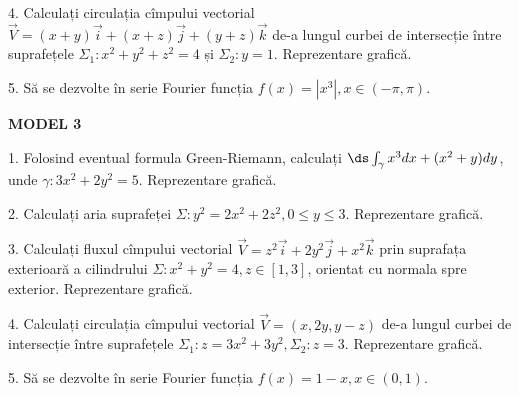 \vspace{0.3cm}

4. Calculați circulația cîmpului vectorial $ \vec{V} = (x + y) \vec{i} + (x + z) \vec{j} + (y + z) \vec{k} $
de-a lungul curbei de intersecție între suprafețele $ \Sigma_1: x^2 + y^2 + z^2 = 4 $ și
$ \Sigma_2: y = 1 $. Reprezentare grafică.

\vspace{0.3cm}

5. Să se dezvolte în serie Fourier funcția $ f(x) = |x^3|, x \in (-\pi, \pi) $.

\vspace{2cm}

\textbf{MODEL 3}

1. Folosind eventual formula Green-Riemann, calculați $ \ds\int_\gamma x^3 dx + (x^2 + y) dy $,
unde $ \gamma: 3x^2 + 2y^2 = 5 $. Reprezentare grafică.

\vspace{0.3cm}

2. Calculați aria suprafeței $ \Sigma: y^2 = 2x^2 + 2z^2, 0 \leq y \leq 3 $. Reprezentare grafică.

\vspace{0.3cm}

3. Calculați fluxul cîmpului vectorial $ \vec{V} = z^2 \vec{i} + 2y^2 \vec{j} + x^2 \vec{k} $
prin suprafața exterioară a cilindrului $ \Sigma: x^2 + y^2 = 4, z \in [1, 3] $, orientat
cu normala spre exterior. Reprezentare grafică.

\vspace{0.3cm}

4. Calculați circulația cîmpului vectorial $ \vec{V} = (x, 2y, y-z) $ de-a lungul
curbei de intersecție între suprafețele $ \Sigma_1: z = 3x^2 + 3y^2, \Sigma_2: z = 3 $.
Reprezentare grafică.

\vspace{0.3cm}

5. Să se dezvolte în serie Fourier funcția $ f(x) = 1 - x, x \in (0, 1) $.